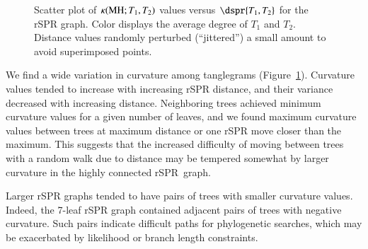 \documentclass[]{elsarticle}
\let\MYoriglatexcaption\caption
\renewcommand{\caption}[2][\relax]{\MYoriglatexcaption[#2]{#2}}
\newcommand{\MH}{\operatorname{MH}}
\newcommand{\curvature}[2][]{%
    \ifthenelse{\equal{#1}{}}%
		{\kappa(#2)}%
		{\kappa_{#1}(#2)}%
}
\begin{document}
\begin{figure}
    \caption{Scatter plot of $\curvature{\MH; T_1,T_2}$ values versus $\dspr{T_1,T_2}$ for the rSPR graph. Color displays the average degree of $T_1$ and $T_2$. Distance values randomly perturbed (``jittered'') a small amount to avoid superimposed points.}
	\label{fig:rspr-scatter}
\end{figure}

We find a wide variation in curvature among tanglegrams (Figure~\ref{fig:rspr-scatter}).
Curvature values tended to increase with increasing rSPR distance, and their variance decreased with increasing distance.
Neighboring trees achieved minimum curvature values for a given number of leaves, and we found maximum curvature values between trees at maximum distance or one rSPR move closer than the maximum.
This suggests that the increased difficulty of moving between trees with a random walk due to distance may be tempered somewhat by larger curvature in the highly connected rSPR~graph.

Larger rSPR graphs tended to have pairs of trees with smaller curvature values.
Indeed, the 7-leaf rSPR graph contained adjacent pairs of trees with negative curvature.
Such pairs indicate difficult paths for phylogenetic searches, which may be exacerbated by likelihood or branch length constraints.
\end{document}
